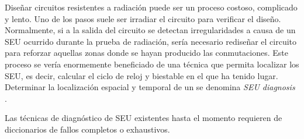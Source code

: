 Diseñar circuitos resistentes a radiación puede ser un proceso costoso, complicado
y lento. Uno de los pasos suele ser irradiar el circuito para verificar el diseño.
Normalmente, si a la salida del circuito se detectan irregularidades a causa de un
\gls{SEU} ocurrido durante la prueba de radiación, sería necesario rediseñar el
circuito para reforzar aquellas zonas donde se hayan producido las conmutaciones.
Este proceso se vería enormemente beneficiado de una técnica que permita localizar
los \gls{SEU}, es decir, calcular el ciclo de reloj y biestable en el que ha
tenido lugar. Determinar la localización espacial y temporal de un \SEU se
denomina \textit{\gls{SEU} diagnosis} \cite{SEUDiagnosis}.

Las técnicas de diagnóstico de \gls{SEU} existentes hasta el momento requieren de
diccionarios de fallos completos o exhaustivos. 

\endinput

